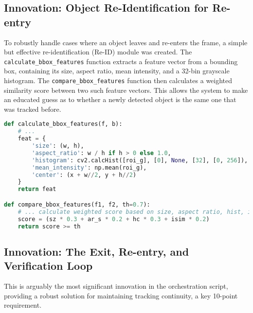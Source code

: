 \documentclass[12pt, a4paper]{article}
\begin{document}
\subsection{Innovation: Object Re-Identification for Re-entry}
To robustly handle cases where an object leaves and re-enters the frame, a simple but effective re-identification (Re-ID) module was created. The \lstinline!calculate_bbox_features! function extracts a feature vector from a bounding box, containing its size, aspect ratio, mean intensity, and a 32-bin grayscale histogram. The \lstinline!compare_bbox_features! function then calculates a weighted similarity score between two such feature vectors. This allows the system to make an educated guess as to whether a newly detected object is the same one that was tracked before.

\begin{lstlisting}[language=Python, caption={Feature extraction and comparison for Re-ID.}, label={lst:reid_funcs}]
def calculate_bbox_features(f, b):
    # ...
    feat = {
        'size': (w, h),
        'aspect_ratio': w / h if h > 0 else 1.0,
        'histogram': cv2.calcHist([roi_g], [0], None, [32], [0, 256]),
        'mean_intensity': np.mean(roi_g),
        'center': (x + w//2, y + h//2)
    }
    return feat

def compare_bbox_features(f1, f2, th=0.7):
    # ... calculate weighted score based on size, aspect ratio, hist, intensity
    score = (sz * 0.3 + ar_s * 0.2 + hc * 0.3 + isim * 0.2)
    return score >= th
\end{lstlisting}

\subsection{Innovation: The Exit, Re-entry, and Verification Loop}
This is arguably the most significant innovation in the orchestration script, providing a robust solution for maintaining tracking continuity, a key 10-point requirement.
\end{document}
